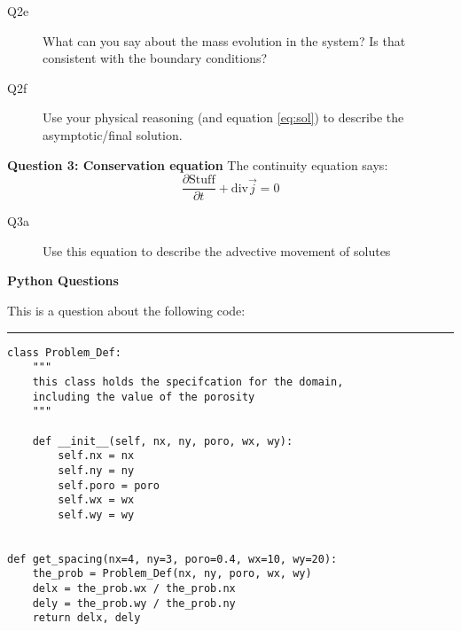 \documentclass{article}
\begin{document}

\begin{description}
\item [Q2e] What can you say about the mass evolution in the system? Is that consistent with the boundary conditions?
\vspace{2cm}

\item [Q2f] Use your physical reasoning (and equation \ref{eq:sol}) to describe the asymptotic/final solution.
\vspace{2cm}

\end{description}

\textbf{Question 3: Conservation equation}
The continuity equation says:
\begin{equation}
\frac{\partial \mathrm{Stuff}}{\partial t} + \mathrm{div} \overrightarrow{j} = 0
\end{equation}


\begin{description}
\item [Q3a] Use this equation to describe the advective movement of solutes
\vspace{2cm}


\end{description}



\newpage
\textbf{Python Questions}


This is a question about the following code:

\rule{15cm}{0.75pt}


\begin{verbatim}
class Problem_Def:
    """
    this class holds the specifcation for the domain,
    including the value of the porosity
    """

    def __init__(self, nx, ny, poro, wx, wy):
        self.nx = nx
        self.ny = ny
        self.poro = poro
        self.wx = wx
        self.wy = wy


def get_spacing(nx=4, ny=3, poro=0.4, wx=10, wy=20):
    the_prob = Problem_Def(nx, ny, poro, wx, wy)
    delx = the_prob.wx / the_prob.nx
    dely = the_prob.wy / the_prob.ny
    return delx, dely
\end{verbatim}
\end{document}

